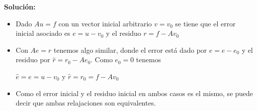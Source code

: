 \documentclass[spanish]{article}
\begin{document}
\begin{enumerate}
       
       \textbf{Solución:}
       
       \begin{itemize}
                \item Dado $Au = f$ con un vector inicial arbitrario $v = v_0$ se tiene que el error inicial asociado es $e = u - v_0$ y el residuo $r = f - Av_0$
                \item Con $Ae = r$ tenemos algo similar, donde el error está dado por $\hat{e} = e - e_0$  y el residuo por $\hat{r} = r_0 - Ae_0$. Como $e_0 = 0$ tenemos
                \begin{center}
                    $ \hat{e} = e = u - v_0 $ y $\hat{r} = r_0 = f - Av_0$
                \end{center}
                \item Como el error inicial y el residuo inicial en ambos casos es el mismo, se puede decir que ambas relajaciones son equivalentes.
       \end{itemize}
       
 
%           
%
%          
%          
%          
%
%  
%        
%            


\end{enumerate}
\end{document}
